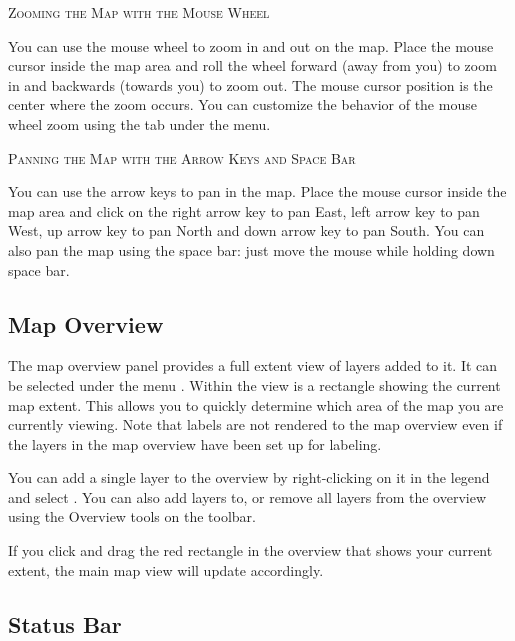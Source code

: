 \begin{Tip}\caption{\textsc{Zooming the Map with the Mouse
Wheel}}
You can use the mouse wheel to zoom in and out on the map. Place
the mouse cursor inside the map area and roll the wheel forward (away from you) to
zoom in and backwards (towards you) to zoom out. The mouse cursor position is the
center where the zoom occurs. You can customize the behavior of the mouse
wheel zoom using the  tab under the  \arrow
{} menu.
\end{Tip}

\begin{Tip}\caption{\textsc{Panning the Map with the Arrow Keys and Space
Bar}}
You can use the arrow keys to pan in the map. Place the mouse cursor
inside the map area and click on the right arrow key to pan East, left arrow
key to pan West, up arrow key to pan North and down arrow key to pan South.
You can also pan the map using the space bar: just move the mouse while
holding down space bar.
\end{Tip}

\subsection{Map Overview}\label{label_mapoverview}

The map overview panel provides a full extent view of layers added to it. It
can be selected under the menu  \arrow {}.
Within the view is a rectangle showing the current map extent. This allows
you to quickly determine which area of the map you are currently viewing. Note
that labels are not rendered to the map overview even if the layers in the
map overview have been set up for labeling.

You can add a single layer to the overview by right-clicking on it in the
legend and select . You can also add layers to,
or remove all layers from the overview using the Overview tools on the toolbar.

If you click and drag the red rectangle in the overview that shows your
current extent, the main map view will update accordingly.

\subsection{Status Bar}\label{label_statusbar}

